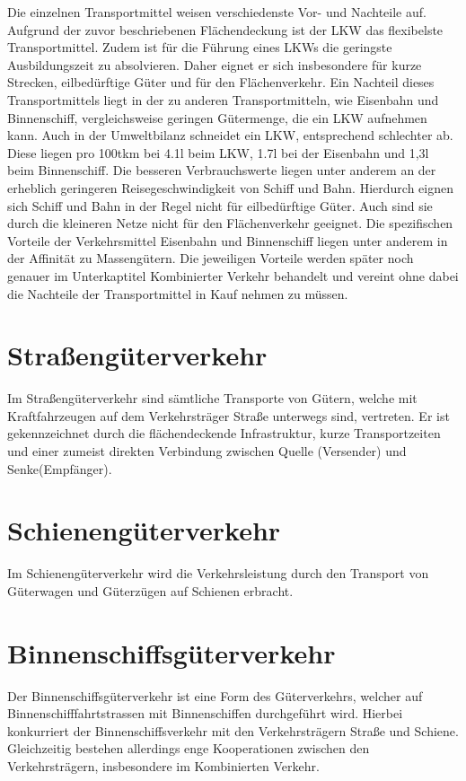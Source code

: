 \documentclass[a4paper,12pt]{scrreprt}
\begin{document}
	Die einzelnen Transportmittel weisen verschiedenste Vor- und Nachteile auf. Aufgrund der zuvor beschriebenen Flächendeckung ist der LKW das flexibelste Transportmittel. Zudem ist für die Führung eines LKWs die geringste Ausbildungszeit zu absolvieren. Daher eignet er sich insbesondere für kurze Strecken, eilbedürftige Güter und für den Flächenverkehr. Ein Nachteil dieses Transportmittels liegt in der zu anderen Transportmitteln, wie Eisenbahn und Binnenschiff, vergleichsweise  geringen Gütermenge, die ein LKW aufnehmen kann. Auch in der Umweltbilanz schneidet ein LKW, entsprechend schlechter ab. Diese liegen pro 100tkm bei 4.1l beim LKW, 1.7l bei der Eisenbahn und 1,3l beim Binnenschiff. Die besseren Verbrauchswerte liegen unter anderem an der erheblich geringeren Reisegeschwindigkeit von Schiff und Bahn. Hierdurch eignen sich Schiff und Bahn in der Regel nicht für eilbedürftige Güter. Auch sind sie durch die kleineren Netze nicht für den Flächenverkehr geeignet. Die spezifischen Vorteile der Verkehrsmittel Eisenbahn und Binnenschiff liegen unter anderem in der Affinität zu Massengütern. Die jeweiligen Vorteile werden später noch genauer im Unterkaptitel Kombinierter Verkehr behandelt und vereint ohne dabei die Nachteile der Transportmittel in Kauf nehmen zu müssen.
	\section{Straßengüterverkehr}
	Im Straßengüterverkehr sind sämtliche Transporte von Gütern, welche mit Kraftfahrzeugen auf dem Verkehrsträger Straße unterwegs sind, vertreten. Er ist gekennzeichnet durch die flächendeckende Infrastruktur, kurze Transportzeiten und einer zumeist direkten Verbindung zwischen Quelle (Versender) und Senke(Empfänger).\\
	
	
	
	\section{Schienengüterverkehr}
	Im Schienengüterverkehr wird die Verkehrsleistung durch den Transport von Güterwagen und Güterzügen auf Schienen erbracht.\\
	
	
	\section{Binnenschiffsgüterverkehr}
	Der Binnenschiffsgüterverkehr ist eine Form des Güterverkehrs, welcher auf Binnenschifffahrtstrassen mit Binnenschiffen durchgeführt wird. Hierbei konkurriert der Binnenschiffsverkehr mit den Verkehrsträgern Straße und Schiene. Gleichzeitig bestehen allerdings enge Kooperationen zwischen den Verkehrsträgern, insbesondere im Kombinierten Verkehr.\\
	
\end{document}
